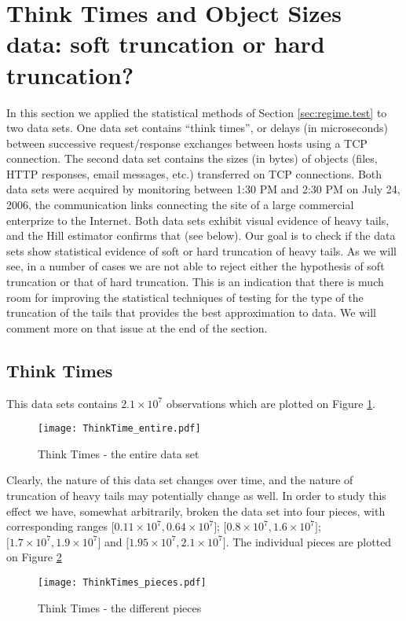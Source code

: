 \documentclass[11pt]{amsart}
\numberwithin{equation}{section}
\begin{document}
\section{Think Times and Object Sizes data:  soft truncation or hard 
  truncation? }  \label{sec:data.analysis}

In this section we applied the statistical methods of Section
\ref{sec:regime.test} to two data sets. One data set contains
``think times'', or delays (in microseconds) between successive
request/response exchanges between hosts using a TCP connection.
The second data set contains the sizes (in bytes) of objects
(files, HTTP responses, email messages, etc.) transferred on TCP
connections. Both data sets were acquired by monitoring between
1:30 PM and 2:30 PM on July 24, 2006, the communication links
connecting the site of a large commercial enterprize to the
Internet. Both data sets exhibit visual evidence of heavy tails,
and the Hill estimator confirms that (see below).  Our goal is to
check if the data sets show statistical evidence of soft or hard 
truncation of heavy tails. As we will see, in a number of cases we are
not able to reject either the hypothesis of soft truncation or that of
hard truncation. This is an indication that there is much room for
improving the statistical techniques of testing for the type of the
truncation of the tails that provides the best approximation to
data. We will comment more on that issue at the end of the section. 

\subsection{Think Times} This data sets contains $2.1\times10^7$
observations which are plotted on Figure \ref{data:ThinkTime}.
\begin{figure}
\begin{center}
\texttt{[image: ThinkTime\_entire.pdf]}
\caption{Think Times - the entire data set}\label{data:ThinkTime}
\end{center}
\end{figure}

Clearly, the nature of this data set changes over time, and the nature
of truncation of heavy tails may potentially change as well.
In order to study this effect we have, somewhat arbitrarily, broken
the data set into four pieces, with corresponding ranges
$\bigl[ 0.11\times 10^7, 0.64\times10^7\bigr]$;
$\bigl[ 0.8\times 10^7, 1.6\times10^7\bigr]$;
$\bigl[ 1.7\times 10^7, 1.9\times10^7\bigr]$ and
$\bigl[ 1.95\times 10^7, 2.1\times10^7\bigr]$.
The individual pieces are plotted on Figure \ref{data:ThinkTimes_pieces}
\begin{figure}
\begin{center}
\texttt{[image: ThinkTimes\_pieces.pdf]}
\caption{Think Times - the different pieces}\label{data:ThinkTimes_pieces}
\end{center}
\end{figure}
\end{document}
